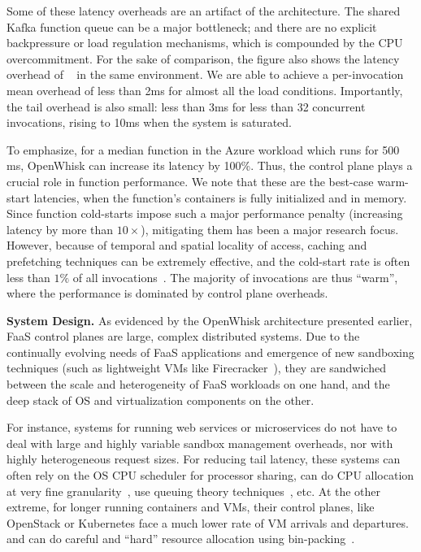 Some of these latency overheads are an artifact of the architecture. 
The shared Kafka function queue can be a major bottleneck; and there are no explicit backpressure or load regulation mechanisms, which is compounded by the CPU overcommitment. 
%
For the sake of comparison, the figure also shows the latency overhead of \sysname~ in the same environment. 
We are able to achieve a per-invocation mean overhead of less than 2ms for almost all the load conditions.
Importantly, the tail overhead is also small: less than 3ms for less than 32 concurrent invocations, rising to 10ms when the system is saturated.


To emphasize, for a median function in the Azure workload which runs for 500 ms, OpenWhisk can increase its latency by 100\%.  
Thus, the control plane plays a crucial role in function performance.
We note that these are the best-case warm-start latencies, when the function's containers is fully initialized and in memory. 
Since function cold-starts impose such a major performance penalty (increasing latency by more than $10\times$), mitigating them has been a major research focus. 
However, because of temporal and spatial locality of access, caching and prefetching techniques can be extremely effective, and the cold-start rate is often less than $1\% $ of all invocations~\cite{faascache-asplos21}. 
The majority of invocations are thus ``warm'', where the performance is dominated by control plane overheads.

\noindent \textbf{System Design.}
%
As evidenced by the OpenWhisk architecture presented earlier, FaaS control planes are large, complex distributed systems.
Due to the continually evolving needs of FaaS applications and emergence of new sandboxing techniques (such as lightweight VMs like Firecracker~\cite{firecracker-nsdi20}), they are sandwiched between the scale and heterogeneity of FaaS workloads on one hand, and the deep stack of OS and virtualization components on the other. 

For instance, systems for running web services or microservices do not have to deal with large and highly variable sandbox management overheads, nor with highly heterogeneous request sizes.
For reducing tail latency, these systems can often rely on the OS CPU scheduler for processor sharing, can do CPU allocation at very fine granularity~\cite{kaffes2019shinjuku}, use queuing theory techniques~\cite{prekas2017zygos}, etc. 
At the other extreme, for longer running containers and VMs, their control planes, like OpenStack or Kubernetes face a much lower rate of VM arrivals and departures. and can do careful and ``hard'' resource allocation using bin-packing~\cite{cortez2017resource}.



